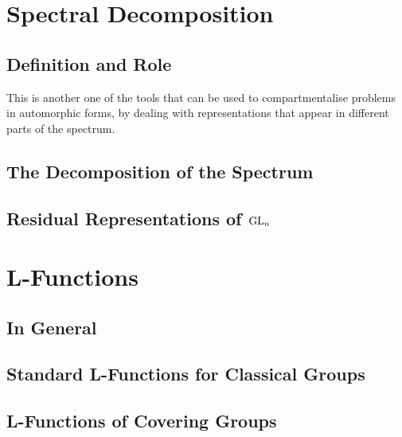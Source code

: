 \section{Spectral Decomposition}
\subsection{Definition and Role}
This is another one of the tools that can be used to compartmentalise problems in automorphic forms, by dealing with representations that appear in different parts of the spectrum. 

\subsection{The Decomposition of the Spectrum}


\subsection{Residual Representations of \(\operatorname{GL}_n\)}


\section{L-Functions}
\subsection{In General}
\subsection{Standard L-Functions for Classical Groups}
\subsection{L-Functions of Covering Groups}
